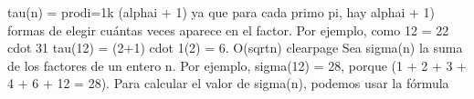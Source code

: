 {}\markdownRendererDollarSign{}\markdownRendererDollarSign{}\markdownRendererSoftLineBreak
{}\markdownRendererBackslash{}tau(n) = \markdownRendererBackslash{}prod\markdownRendererUnderscore{}\markdownRendererLeftBrace{}i=1\markdownRendererRightBrace{}\markdownRendererCircumflex{}\markdownRendererLeftBrace{}k\markdownRendererRightBrace{} (\markdownRendererBackslash{}alpha\markdownRendererUnderscore{}i + 1)\markdownRendererSoftLineBreak
{}\markdownRendererDollarSign{}\markdownRendererDollarSign{}\markdownRendererParagraphSeparator
{}ya que para cada primo \markdownRendererDollarSign{}p\markdownRendererUnderscore{}i\markdownRendererDollarSign{}, hay \markdownRendererDollarSign{}\markdownRendererBackslash{}alpha\markdownRendererUnderscore{}i + 1)\markdownRendererDollarSign{} formas de elegir cuántas veces aparece en el factor. Por ejemplo, como \markdownRendererDollarSign{}12 = 2\markdownRendererCircumflex{}2 \markdownRendererBackslash{}cdot 3\markdownRendererCircumflex{}1\markdownRendererDollarSign{} \markdownRendererDollarSign{}\markdownRendererBackslash{}tau(12) = (2+1) \markdownRendererBackslash{}cdot 1(2) = 6\markdownRendererDollarSign{}.\markdownRendererParagraphSeparator
{} \markdownRendererDollarSign{}O(\markdownRendererBackslash{}sqrt\markdownRendererLeftBrace{}n\markdownRendererRightBrace{})\markdownRendererDollarSign{}\markdownRendererInterblockSeparator
{}\markdownRendererInterblockSeparator
{}\markdownRendererDollarSign{}\markdownRendererBackslash{}clearpage\markdownRendererDollarSign{}\markdownRendererInterblockSeparator
{}
\markdownRendererSectionEnd 
\markdownRendererSectionEnd \markdownRendererSectionBegin
{}\markdownRendererInterblockSeparator
{}Sea \markdownRendererDollarSign{}\markdownRendererBackslash{}sigma(n)\markdownRendererDollarSign{} la suma de los factores de un entero n. Por ejemplo, \markdownRendererDollarSign{}\markdownRendererBackslash{}sigma(12) = 28\markdownRendererDollarSign{}, porque (1 + 2 + 3 + 4 + 6 + 12 = 28). Para calcular el valor de \markdownRendererDollarSign{}\markdownRendererBackslash{}sigma(n)\markdownRendererDollarSign{}, podemos usar la fórmula\markdownRendererParagraphSeparator
{}\markdownRendererDollarSign{}\markdownRendererDollarSign{}\markdownRendererSoftLineBreak
